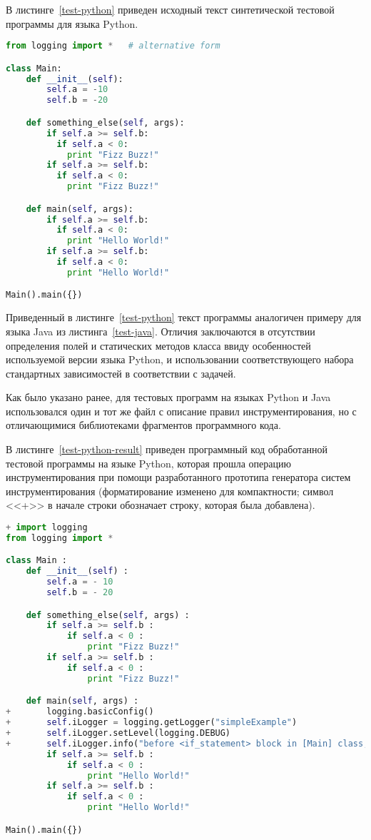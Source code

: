 В листинге~\ref{test-python} приведен исходный текст синтетической тестовой программы для языка Python.

\begin{lstlisting}[frame=single, language=Python, label={test-python}, caption={Исходный текст тестового приложения.}]
from logging import *   # alternative form

class Main:
    def __init__(self):
        self.a = -10
        self.b = -20

    def something_else(self, args):
        if self.a >= self.b:
          if self.a < 0:
            print "Fizz Buzz!"
        if self.a >= self.b:
          if self.a < 0:
            print "Fizz Buzz!"

    def main(self, args):
        if self.a >= self.b:
          if self.a < 0:
            print "Hello World!"
        if self.a >= self.b:
          if self.a < 0:
            print "Hello World!"

Main().main({})
\end{lstlisting}

Приведенный в листинге~\ref{test-python} текст программы аналогичен примеру для языка Java из листинга~\ref{test-java}.
Отличия заключаются в отсутствии определения полей и статических методов класса ввиду особенностей используемой версии языка Python, и использовании соответствующего набора стандартных зависимостей в соответствии с задачей.

Как было указано ранее, для тестовых программ на языках Python и Java использовался один и тот же файл с описание правил инструментирования, но с отличающимися библиотеками фрагментов программного кода.

В листинге~\ref{test-python-result} приведен программный код обработанной тестовой программы на языке Python, которая прошла операцию инструментирования при помощи разработанного прототипа генератора систем инструментирования (форматирование изменено для компактности; символ <<+>> в начале строки обозначает строку, которая была добавлена).

\begin{lstlisting}[frame=single, language=Python, label={test-python-result}, caption={Текст инструментированного тестового приложения.}]
+ import logging
from logging import *

class Main :
    def __init__(self) :
        self.a = - 10
        self.b = - 20

    def something_else(self, args) :
        if self.a >= self.b :
            if self.a < 0 :
                print "Fizz Buzz!"
        if self.a >= self.b :
            if self.a < 0 :
                print "Fizz Buzz!"

    def main(self, args) :
+       logging.basicConfig()
+       self.iLogger = logging.getLogger("simpleExample")
+       self.iLogger.setLevel(logging.DEBUG)
+       self.iLogger.info("before <if_statement> block in [Main] class, in {main} method")
        if self.a >= self.b :
            if self.a < 0 :
                print "Hello World!"
        if self.a >= self.b :
            if self.a < 0 :
                print "Hello World!"

Main().main({})
\end{lstlisting}

